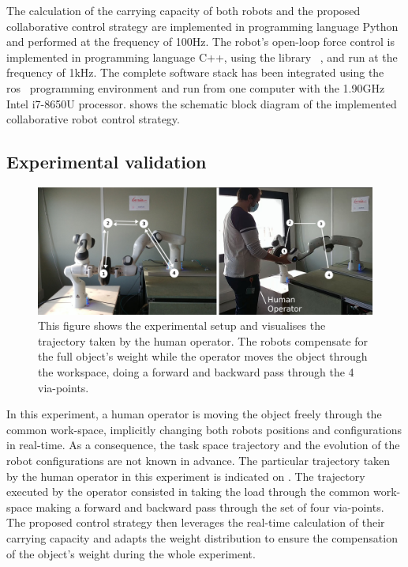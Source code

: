 The calculation of the carrying capacity of both robots and the proposed collaborative control strategy are implemented in programming language Python and performed at the frequency of 100Hz.  The robot's open-loop force control is implemented in programming language C++, using the library ~\cite{pinocchio2021}, and run at the frequency of 1kHz. The complete software stack has been integrated using the \gls{ros}~\cite{ros} programming environment and run from one computer with the 1.90GHz Intel i7-8650U processor. 
 shows the schematic block diagram of the implemented collaborative robot control strategy. 

\subsection{Experimental validation}
\label{sec:experiment_dual_robto_carrying}
\begin{figure}[!h]
    \centering
    \includegraphics[width=\linewidth]{Papers/images/exp1_explication.jpg}
    \caption{This figure shows the experimental setup and visualises the trajectory taken by the human operator. The robots compensate for the full object's weight while the operator moves the object through the workspace, doing a forward and backward pass through the 4 via-points.}
    \label{fig:experiment1}
\end{figure}

In this experiment, a human operator is moving the object freely through the common work-space, implicitly changing both robots positions and configurations in real-time.   As a consequence, the task space trajectory and the evolution of the robot configurations are not known in advance. 
The particular trajectory taken by the human operator in this experiment is indicated on . 
The trajectory executed by the operator consisted in taking the load through the common work-space making a forward and backward pass through the set of four via-points. 
The proposed control strategy then leverages the real-time calculation of their carrying capacity and adapts the weight distribution to ensure the compensation of the object's weight during the whole experiment. 

